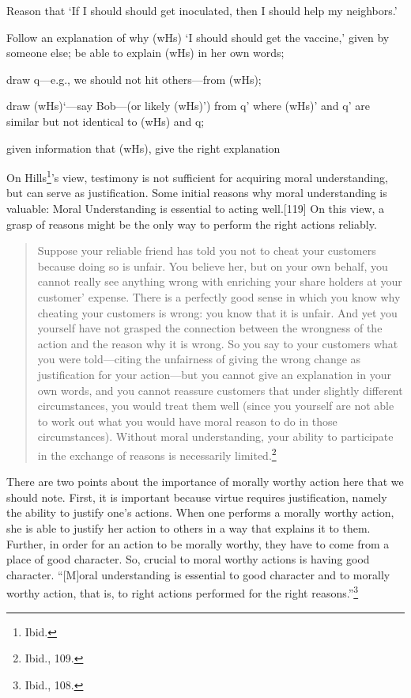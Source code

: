 \documentclass[phdthesis,12pt,final]{wuthesis}
\theoremstyle{definition}
\theoremstyle{definition}
\theoremstyle{definition}
\theoremstyle{definition}
\theoremstyle{remark}
\begin{document}
Reason that `If I should should get inoculated, then I should help my neighbors.'

Follow an explanation of why (wHs) `I should should get the vaccine,' given by someone else; be able to explain (wHs) in her own words;

draw q---e.g., we should not hit others---from (wHs);

draw (wHs)`---say Bob---(or likely (wHs)') from q' where (wHs)' and q' are similar but not identical to (wHs) and q;

given information that (wHs), give the right explanation

On Hills\footnote{Ibid.}'s view, testimony is not sufficient for acquiring moral understanding, but can serve as justification. Some initial reasons why moral understanding is valuable: Moral Understanding is essential to acting well.{[}119{]} On this view, a grasp of reasons might be the only way to perform the right actions reliably.

\begin{quote}
Suppose your reliable friend has told you not to cheat your customers because doing so is unfair. You believe her, but on your own behalf, you cannot really see anything wrong with enriching your share holders at your customer' expense. There is a perfectly good sense in which you know why cheating your customers is wrong: you know that it is unfair. And yet you yourself have not grasped the connection between the wrongness of the action and the reason why it is wrong. So you say to your customers what you were told---citing the unfairness of giving the wrong change as justification for your action---but you cannot give an explanation in your own words, and you cannot reassure customers that under slightly different circumstances, you would treat them well (since you yourself are not able to work out what you would have moral reason to do in those circumstances). Without moral understanding, your ability to participate in the exchange of reasons is necessarily limited.\footnote{Ibid., 109.}
\end{quote}

There are two points about the importance of morally worthy action here that we should note. First, it is important because virtue requires justification, namely the ability to justify one's actions. When one performs a morally worthy action, she is able to justify her action to others in a way that explains it to them. Further, in order for an action to be morally worthy, they have to come from a place of good character. So, crucial to moral worthy actions is having good character. ``{[}M{]}oral understanding is essential to good character and to morally worthy action, that is, to right actions performed for the right reasons.''\footnote{Ibid., 108.}
\end{document}
